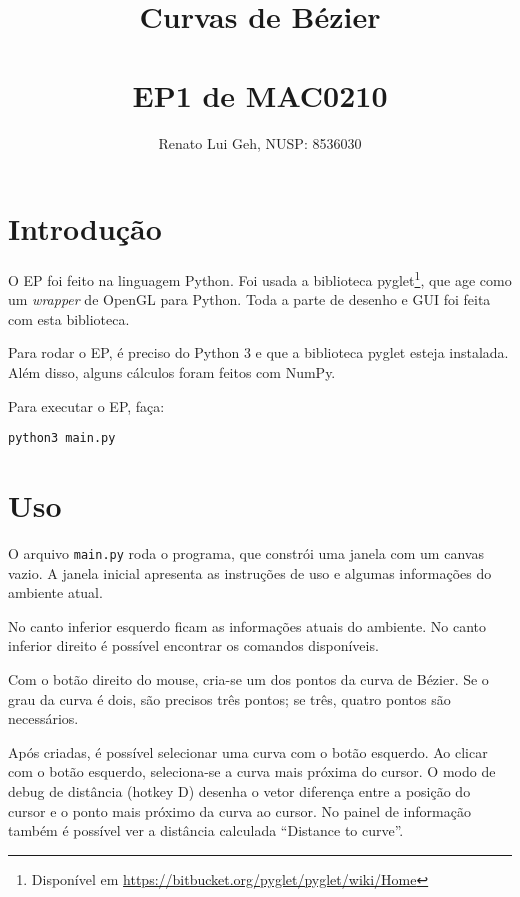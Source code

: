 \documentclass[12pt]{article}
\title{%
  Curvas de Bézier\\~\\
  {\normalfont EP1 de MAC0210}
}
\author{Renato Lui Geh, NUSP: 8536030}
\date{}
\theoremstyle{plain}
\numberwithin{equation}{section}
\newcommand{\code}[1]{\lstinline[mathescape=true]{#1}}
\begin{document}
\maketitle

\section{Introdução}

O EP foi feito na linguagem Python. Foi usada a biblioteca pyglet\footnote{Disponível em
\url{https://bitbucket.org/pyglet/pyglet/wiki/Home}}, que age como um \textit{wrapper} de OpenGL
para Python. Toda a parte de desenho e GUI foi feita com esta biblioteca.

Para rodar o EP, é preciso do Python 3 e que a biblioteca pyglet esteja instalada. Além disso,
alguns cálculos foram feitos com NumPy.

Para executar o EP, faça:

\begin{lstlisting}[numbers=none]
  python3 main.py
\end{lstlisting}

\section{Uso}

O arquivo \code{main.py} roda o programa, que constrói uma janela com um canvas vazio. A janela
inicial apresenta as instruções de uso e algumas informações do ambiente atual.

\begin{figure}[h]
  \centering{}
\end{figure}

No canto inferior esquerdo ficam as informações atuais do ambiente. No canto inferior direito é
possível encontrar os comandos disponíveis.

Com o botão direito do mouse, cria-se um dos pontos da curva de Bézier. Se o grau da curva é dois,
são precisos três pontos; se três, quatro pontos são necessários.

\begin{figure}[h]
  \centering{}
\end{figure}

Após criadas, é possível selecionar uma curva com o botão esquerdo. Ao clicar com o botão esquerdo,
seleciona-se a curva mais próxima do cursor. O modo de debug de distância (hotkey D) desenha o
vetor diferença entre a posição do cursor e o ponto mais próximo da curva ao cursor. No painel de
informação também é possível ver a distância calculada ``Distance to curve''.
\end{document}
